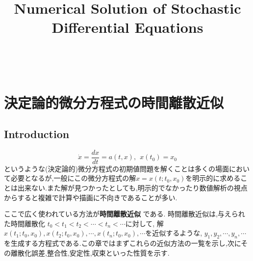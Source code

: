 \documentclass[a4paper]{jreport}
\title{Numerical Solution of Stochastic Differential Equations}
\numberwithin{equation}{section}
\def\eq{\begin{equation}}
\def\eqx{\end{equation}}
\begin{document}
\maketitle
\tableofcontents
\leavevmode \\
\chapter{決定論的微分方程式の時間離散近似}
\section{Introduction}
\eq
\label{eq1}
\dot{x} = \frac{dx}{dt} = a(t,x), \  \  x(t_0) = x_0
\eqx
というような(決定論的)微分方程式の初期値問題を解くことは多くの場面において必要となるが,一般にこの微分方程式の解$x = x(t;t_0,x_0)$を明示的に求めることは出来ない.また解が見つかったとしても,明示的でなかったり数値解析の視点からすると複雑で計算や描画に不向きであることが多い.\par
ここで広く使われている方法が{\bf 時間離散近似} である.
時間離散近似は,与えられた時間離散化 $ t_0 < t_1 < t_2 < \cdots < t_n < \cdots $に対して,
解$x(t_1;t_0,x_0),x(t_2;t_0,x_0),\cdots,x(t_n;t_0,x_0),\cdots$を近似するような,
$y_1,y_2,\cdots,y_n,\cdots$を生成する方程式である.この章ではまずこれらの近似方法の一覧を示し,次にその離散化誤差,整合性,安定性,収束といった性質を示す.
\end{document}
